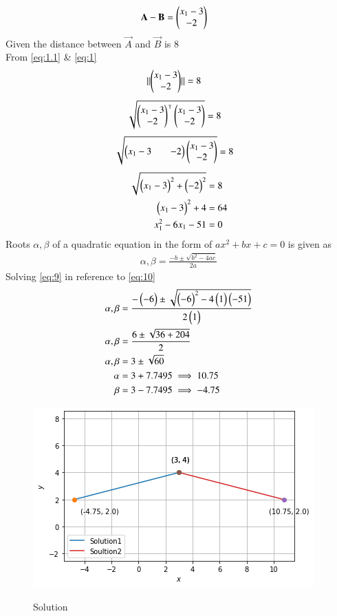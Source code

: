\documentclass[journal,12pt,twocolumn]{IEEEtran}
\begin{document}
\begin{align}
\\\vec{A-B}&=\myvec{x_1-3\\-2}  %
\end{align}
Given the distance between $\vec{A}$ and $\vec{B}$ is 8
\\From \eqref{eq:1.1} & \eqref{eq:1}
\begin{align}
\lVert\begin{pmatrix}x_1-3\\-2\end{pmatrix}\rVert &=8 \label{eq2}
\end{align}
\begin{align}
\sqrt{\begin{pmatrix}x_1-3\\-2\end{pmatrix}^\intercal\begin{pmatrix}x_1-3\\-2\end{pmatrix}}&=8
\end{align}
\begin{align}
\sqrt{\begin{pmatrix}x_1-3&&-2\end{pmatrix}\begin{pmatrix}x_1-3\\-2\end{pmatrix}}&=8
\end{align}
\begin{align}
\sqrt{\begin{pmatrix}x_1-3\end{pmatrix}^2+\begin{pmatrix}-2\end{pmatrix}^2}&=8
\\\begin{pmatrix}x_1-3\end{pmatrix}^2+4&=64
\\x_1^2-6x_1-51&=0  \label{eq:9}
\end{align}
Roots $\alpha,\beta$ of a quadratic equation in the form of $ax^2+bx+c=0$ is given as 
\begin{align}
\alpha,\beta = \frac{-b\pm\sqrt{b^2-4ac}}{2a} \label{eq:10}
\end{align}
Solving \eqref{eq:9} in reference to \eqref{eq:10}
\begin{align}
\alpha,\beta &= \frac{-\begin{pmatrix}-6\end{pmatrix}\pm\sqrt{\begin{pmatrix}-6\end{pmatrix}^2-4\begin{pmatrix}1\end{pmatrix}\begin{pmatrix}-51\end{pmatrix}}}{2\begin{pmatrix}1\end{pmatrix}}
\\\alpha,\beta &= \frac{6\pm\sqrt{36+204}}{2}
\\\alpha,\beta &= 3\pm\sqrt{60}
\\\alpha &= 3+7.7495 \implies 10.75
\\\beta &= 3-7.7495 \implies -4.75
\end{align}
\begin{figure}[!ht]
\includegraphics[width=\columnwidth]{solution.png} \label{fig:image1}
\caption{Solution}
\end{figure}
\end{document}
